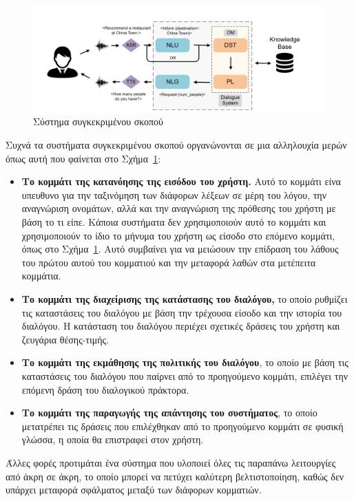 \begin{figure}
    \centering
    \includegraphics[width=\textwidth]{body_matter/dialogue_and_recommendations/images/task-based-dialogue-system.png}
    \caption{Σύστημα συγκεκριμένου σκοπού \cite{recent_advances_dl_2021}}
    \label{fig:task_based_system}
\end{figure}
Συχνά τα συστήματα συγκεκριμένου σκοπού οργανώνονται σε μια αλληλουχία μερών όπως αυτή που φαίνεται στο Σχήμα~\ref{fig:task_based_system}:
\begin{itemize}
    \item \textbf{Το κομμάτι της κατανόησης της εισόδου του χρήστη.} Αυτό το κομμάτι είνα υπευθυνο για την ταξινόμηση των διάφορων λέξεων σε μέρη του λόγου, την αναγνώριση ονομάτων, αλλά και την αναγνώριση της πρόθεσης του χρήστη με βάση το τι είπε. Κάποια συστήματα δεν χρησιμοποιούν αυτό το κομμάτι και χρησιμοποιούν το ίδιο το μήνυμα του χρήστη ως είσοδο στο επόμενο κομμάτι, όπως στο Σχήμα~\ref{fig:task_based_system}. Αυτό συμβαίνει για να μειώσουν την επίδραση του λάθους του πρώτου αυτού του κομματιού και την μεταφορά λαθών στα μετέπειτα κομμάτια. 
    \item \textbf{Το κομμάτι της διαχείρισης της κατάστασης του διαλόγου,} το οποίο ρυθμίζει τις καταστάσεις του διαλόγου με βάση την τρέχουσα είσοδο και την ιστορία του διαλόγου. Η κατάσταση του διαλόγου περιέχει σχετικές δράσεις του χρήστη και ζευγάρια θέσης-τιμής. 
    \item \textbf{Το κομμάτι της εκμάθησης της πολιτικής του διαλόγου}, το οποίο με βάση τις καταστάσεις του διαλόγου που παίρνει από το προηγούμενο κομμάτι, επιλέγει την επόμενη δράση του διαλογικού πράκτορα.
    \item \textbf{Το κομμάτι της παραγωγής της απάντησης του συστήματος}, το οποίο μετατρέπει τις δράσεις που επιλέχθηκαν από το προηγούμενο κομμάτι σε φυσική γλώσσα, η οποία θα επιστραφεί στον χρήστη. 
\end{itemize}

Άλλες φορές προτιμάται ένα σύστημα που υλοποιεί όλες τις παραπάνω λειτουργίες από άκρη σε άκρη, το οποίο μπορεί να πετύχει καλύτερη βελτιστοποίηση, καθώς δεν υπάρχει μεταφορά σφάλματος μεταξύ των διάφορων κομματιών.

